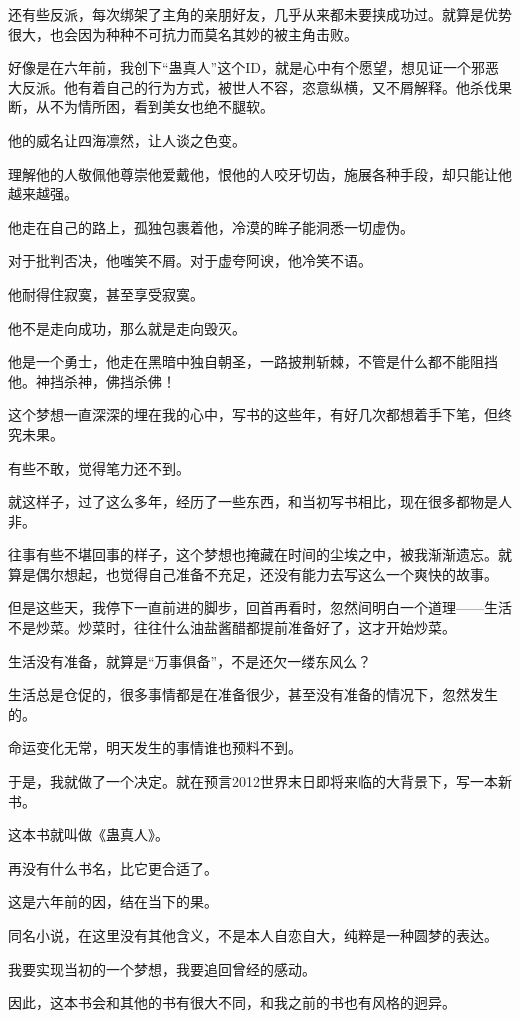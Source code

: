 \begin{this_body}
还有些反派，每次绑架了主角的亲朋好友，几乎从来都未要挟成功过。就算是优势很大，也会因为种种不可抗力而莫名其妙的被主角击败。

好像是在六年前，我创下“蛊真人”这个ID，就是心中有个愿望，想见证一个邪恶大反派。他有着自己的行为方式，被世人不容，恣意纵横，又不屑解释。他杀伐果断，从不为情所困，看到美女也绝不腿软。

他的威名让四海凛然，让人谈之色变。

理解他的人敬佩他尊崇他爱戴他，恨他的人咬牙切齿，施展各种手段，却只能让他越来越强。

他走在自己的路上，孤独包裹着他，冷漠的眸子能洞悉一切虚伪。

对于批判否决，他嗤笑不屑。对于虚夸阿谀，他冷笑不语。

他耐得住寂寞，甚至享受寂寞。

他不是走向成功，那么就是走向毁灭。

他是一个勇士，他走在黑暗中独自朝圣，一路披荆斩棘，不管是什么都不能阻挡他。神挡杀神，佛挡杀佛！

这个梦想一直深深的埋在我的心中，写书的这些年，有好几次都想着手下笔，但终究未果。

有些不敢，觉得笔力还不到。

就这样子，过了这么多年，经历了一些东西，和当初写书相比，现在很多都物是人非。

往事有些不堪回事的样子，这个梦想也掩藏在时间的尘埃之中，被我渐渐遗忘。就算是偶尔想起，也觉得自己准备不充足，还没有能力去写这么一个爽快的故事。

但是这些天，我停下一直前进的脚步，回首再看时，忽然间明白一个道理——生活不是炒菜。炒菜时，往往什么油盐酱醋都提前准备好了，这才开始炒菜。

生活没有准备，就算是“万事俱备”，不是还欠一缕东风么？

生活总是仓促的，很多事情都是在准备很少，甚至没有准备的情况下，忽然发生的。

命运变化无常，明天发生的事情谁也预料不到。

于是，我就做了一个决定。就在预言2012世界末日即将来临的大背景下，写一本新书。

这本书就叫做《蛊真人》。

再没有什么书名，比它更合适了。

这是六年前的因，结在当下的果。

同名小说，在这里没有其他含义，不是本人自恋自大，纯粹是一种圆梦的表达。

我要实现当初的一个梦想，我要追回曾经的感动。

因此，这本书会和其他的书有很大不同，和我之前的书也有风格的迥异。


\end{this_body}
